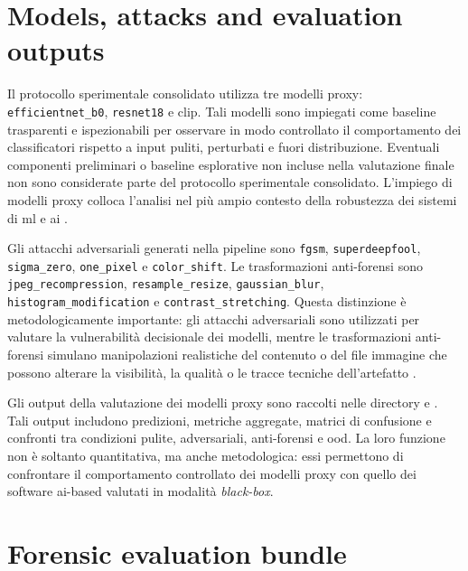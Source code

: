 \section{Models, attacks and evaluation outputs}
\label{app:models-attacks-evaluation-outputs}

Il protocollo sperimentale consolidato utilizza tre modelli proxy: \texttt{efficientnet\_b0}, \texttt{resnet18} e \gls{clip}. Tali modelli sono impiegati come baseline trasparenti e ispezionabili per osservare in modo controllato il comportamento dei classificatori rispetto a input puliti, perturbati e fuori distribuzione. Eventuali componenti preliminari o baseline esplorative non incluse nella valutazione finale non sono considerate parte del protocollo sperimentale consolidato. L'impiego di modelli proxy colloca l'analisi nel più ampio contesto della robustezza dei sistemi di \gls{ml} e \gls{ai} \cite{bishop2006pattern,biggio2018wild,radford2021learning}.

Gli attacchi adversariali generati nella pipeline sono \texttt{fgsm}, \texttt{superdeepfool}, \texttt{sigma\_zero}, \texttt{one\_pixel} e \texttt{color\_shift}. Le trasformazioni anti-forensi sono \texttt{jpeg\_recompression}, \texttt{resample\_resize}, \texttt{gaussian\_blur}, \texttt{histogram\_modification} e \texttt{contrast\_stretching}. Questa distinzione è metodologicamente importante: gli attacchi adversariali sono utilizzati per valutare la vulnerabilità decisionale dei modelli, mentre le trasformazioni anti-forensi simulano manipolazioni realistiche del contenuto o del file immagine che possono alterare la visibilità, la qualità o le tracce tecniche dell'artefatto \cite{stamm2010anti,nowroozi2021survey,croce2020robustbench}.

Gli output della valutazione dei modelli proxy sono raccolti nelle directory  e . Tali output includono predizioni, metriche aggregate, matrici di confusione e confronti tra condizioni pulite, adversariali, anti-forensi e \gls{ood}. La loro funzione non è soltanto quantitativa, ma anche metodologica: essi permettono di confrontare il comportamento controllato dei modelli proxy con quello dei software \gls{ai}-based valutati in modalità \textit{black-box}.

\section{Forensic evaluation bundle}
\label{app:forensic-evaluation-bundle}

